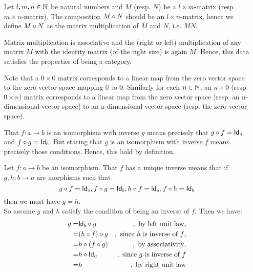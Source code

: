\begin{solution}
\begin{enumerate}
Let $l,m,n \in\NN$ be natural numbers and $M$ (resp. $N$) be a $l\times m$-matrix (resp. $m\times n$-matrix). The composition $\co{N}{M}$ should be an $l\times n$-matrix, hence we define $\co{N}{M}$ as the matrix multiplication of $M$ and $N$, i.e. $MN$.

Matrix multiplication is associative and the (right or left) multiplication of any matrix $M$ with the identity matrix (of the right size) is again $M$. Hence, this data satisfies the properties of being a category. 

Note that a $0 \times 0$ matrix corresponds to a linear map from the zero vector space to the zero vector space mapping $0$ to $0$.
Similarly for each $n \in \NN$, an $n \times 0$ (resp. $0 \times n$) matrix corresponds to a linear map from the zero vector space (resp. an n-dimensional vector space) to an n-dimensional vector space (resp. the zero vector space).

\end{enumerate}
\end{solution}


\begin{solution}\label{sol:inverse-iso}
That $f:a\to b$ is an isomorphism with inverse $g$ means precisely that $\co{f}{g} = \Id[a]$ and $\co{g}{f} = \Id[b]$. But stating that $g$ is an isomorphism with inverse $f$ means precisely those conditions. Hence, this hold by definition.
\end{solution}

\begin{solution}\label{sol:inverse_uniqueness}
Let $f:a\to b$ be an isomorphism. That $f$ has a unique inverse means that if $g,h : b\to a$ are morphisms such that 
\[
\co{f}{g} = \Id[a], \co{g}{f} = \Id[b], \co{f}{h} = \Id[a], \co{h}{f} = \Id[b]
\]
then we must have $g = h$.\\
So assume $g$ and $h$ satisfy the condition of being an inverse of $f$. Then we have:
\begin{eqnarray*}
g =& \co{g}{\Id[b]} &,\text{ by left unit law},\\
	=& \co{g}{(\co{f}{h})} &, \text{ since $h$ is inverse of $f$},\\
	=& \co{(\co{g}{f})}{h} &, \text{ by associativity},\\
	=& \co{\Id[a]}{h} &, \text{ since $g$ is inverse of $f$}\\
	=& h &, \text{ by right unit law}
\end{eqnarray*}
\end{solution}

